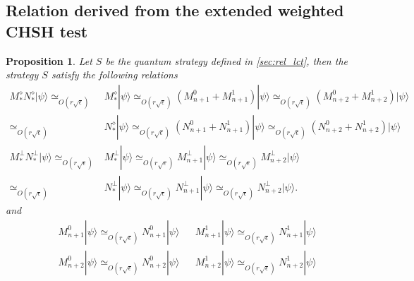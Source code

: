 \documentclass[11pt,letterpaper]{article}
\newcommand{\ket}[1]{|#1\rangle}
\newcommand{\1}{\mathbb{1}}
\newcommand{\se}{\sqrt{\epsilon}}
\newcommand{\appd}[1]{\simeq_{#1}}
\newtheorem{proposition}[theorem]{Proposition}
\theoremstyle{definition}
\begin{document}
\subsection{Relation derived from the extended weighted CHSH test}
\label{sec:rel_chsh}
\begin{proposition}
Let $S$ be the quantum strategy defined in \cref{sec:rel_lct},
then the strategy $S$ satisfy the following relations
\begin{align}
	  M_\ast^\diamond N_\ast^\diamond \ket{\psi}
	  \appd{O( r\se)}&M_\ast^\diamond \ket{\psi} \appd{O( r\se)} (M_{n+1}^0+M_{n+1}^1)\ket{\psi} \appd{O( r\se)} (M_{n+2}^0+M_{n+2}^1)\ket{\psi} \\
	  \appd{O( r\se)}&N_\ast^\diamond \ket{\psi} \appd{O( r\se)} (N_{n+1}^0+N_{n+1}^1)\ket{\psi} \appd{O( r\se)} (N_{n+2}^0+N_{n+2}^1)\ket{\psi}\\
	M_\ast^\perp N_\ast^\perp\ket{\psi}\appd{O( r\se)} &M_\ast^\perp\ket{\psi} \appd{O( r\se)} M_{n+1}^\perp \ket{\psi} \appd{O( r\se)} M_{n+2}^\perp \ket{\psi}\\
	\appd{O( r\se)}&N_\ast^\perp\ket{\psi} \appd{O( r\se)} N_{n+1}^\perp \ket{\psi} \appd{O( r\se)} N_{n+2}^\perp \ket{\psi}.
\end{align}
and
\begin{align}
&M_{n+1}^0 \ket{\psi} \appd{O( r\se)} N_{n+1}^0 \ket{\psi} && M_{n+1}^1\ket{\psi} \appd{O( r\se)} N_{n+1}^1 \ket{\psi}\\
&M_{n+2}^0 \ket{\psi} \appd{O( r\se)} N_{n+2}^0 \ket{\psi} && M_{n+2}^1\ket{\psi} \appd{O( r\se)} N_{n+2}^1 \ket{\psi}
\end{align}
\end{proposition}
\end{document}
